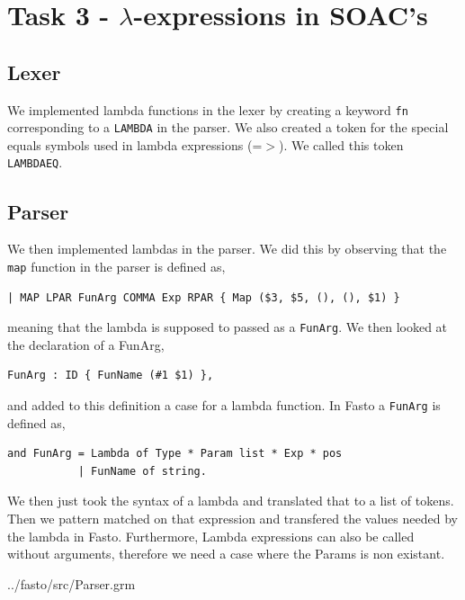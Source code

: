 \documentclass[11pt]{article}
\begin{document}
    \section{Task 3 - $\lambda$-expressions in SOAC's}
    \subsection{Lexer}
    We implemented lambda functions in the lexer by creating a keyword
    \texttt{fn} corresponding to a \texttt{LAMBDA} in the parser.  We also
    created a token for the special equals symbols used in lambda expressions
    (=$>$).  We called this token \texttt{LAMBDAEQ}.
    \subsection{Parser}
    We then implemented lambdas
    in the parser.  We did this by observing that the \texttt{map} function in
    the parser is defined as,

    \begin{lstlisting}[basicstyle=\small]
| MAP LPAR FunArg COMMA Exp RPAR { Map ($3, $5, (), (), $1) }
    \end{lstlisting}

    meaning that the lambda is supposed to passed as a \texttt{FunArg}.  We then
    looked at the declaration of a FunArg,

    \begin{lstlisting}[basicstyle=\small]
FunArg : ID { FunName (#1 $1) },
    \end{lstlisting}

    and added to this definition a case for a lambda function.  In Fasto a
    \texttt{FunArg} is defined as,

    \begin{lstlisting}[basicstyle=\small]
and FunArg = Lambda of Type * Param list * Exp * pos
           | FunName of string.
    \end{lstlisting}

    We then just took the syntax of a lambda and translated that to a list of
    tokens.  Then we pattern matched on that expression and transfered the
    values needed by the lambda in Fasto. Furthermore, Lambda expressions can also
    be called without arguments, therefore we need a case where the Params is non
    existant.


{../fasto/src/Parser.grm}
\end{document}
